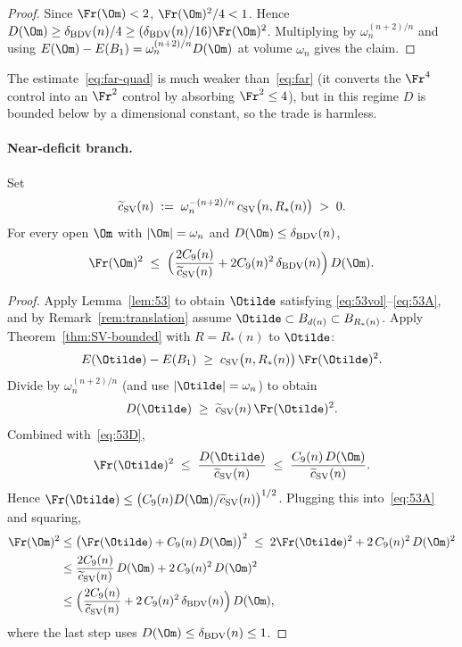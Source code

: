 \begin{proof}
Since $\Fr(\Om)<2$, $\Fr(\Om)^2/4<1$. Hence
$D(\Om)\ge\delta_{\rm BDV}(n)/4\ge(\delta_{\rm BDV}(n)/16)\Fr(\Om)^2$.
Multiplying by $\omega_n^{(n+2)/n}$ and using
$E(\Om)-E(B_1)=\omega_n^{(n+2)/n}D(\Om)$ at volume $\omega_n$ gives the
claim.
\end{proof}

\begin{remark}
The estimate~\eqref{eq:far-quad} is much weaker than~\eqref{eq:far}
(it converts the $\Fr^4$ control into an $\Fr^2$ control by absorbing
$\Fr^2\le 4$), but in this regime $D$ is bounded below by a
dimensional constant, so the trade is harmless.
\end{remark}

\paragraph{Near-deficit branch.}

\begin{lemma}\label{lem:near}
Set
\begin{equation}\label{eq:csv-tilde}
\widetilde c_{\rm SV}(n)
\;:=\; \omega_n^{-(n+2)/n}\,c_{\rm SV}\bigl(n,R_*(n)\bigr)\;>\;0.
\end{equation}
For every open $\Om$ with $|\Om|=\omega_n$ and
$D(\Om)\le\delta_{\rm BDV}(n)$,
\begin{equation}\label{eq:near-Fr}
\Fr(\Om)^2 \;\le\;
\Bigl(\frac{2C_9(n)}{\widetilde c_{\rm SV}(n)}
+2C_9(n)^2\,\delta_{\rm BDV}(n)\Bigr)\,D(\Om).
\end{equation}
\end{lemma}

\begin{proof}
Apply Lemma~\ref{lem:53} to obtain $\Otilde$ satisfying
\eqref{eq:53vol}--\eqref{eq:53A}, and by Remark~\ref{rem:translation}
assume $\Otilde\subset B_{d(n)}\subset B_{R_*(n)}$. Apply
Theorem~\ref{thm:SV-bounded} with $R=R_*(n)$ to $\Otilde$:
\[
E(\Otilde)-E(B_1) \;\ge\; c_{\rm SV}\bigl(n,R_*(n)\bigr)\,\Fr(\Otilde)^2.
\]
Divide by $\omega_n^{(n+2)/n}$ (and use $|\Otilde|=\omega_n$) to obtain
\begin{equation}\label{eq:Dtilde-Atilde}
D(\Otilde) \;\ge\; \widetilde c_{\rm SV}(n)\,\Fr(\Otilde)^2.
\end{equation}
Combined with~\eqref{eq:53D},
\[
\Fr(\Otilde)^2 \;\le\;
\frac{D(\Otilde)}{\widetilde c_{\rm SV}(n)}
\;\le\;
\frac{C_9(n)\,D(\Om)}{\widetilde c_{\rm SV}(n)}.
\]
Hence
$\Fr(\Otilde)\le\bigl(C_9(n)D(\Om)/\widetilde c_{\rm SV}(n)\bigr)^{1/2}$.
Plugging this into~\eqref{eq:53A} and squaring,
\begin{align*}
\Fr(\Om)^2
&\le \bigl(\Fr(\Otilde) + C_9(n)\,D(\Om)\bigr)^2
\;\le\; 2\Fr(\Otilde)^2 + 2\,C_9(n)^2\,D(\Om)^2 \\
&\le \frac{2C_9(n)}{\widetilde c_{\rm SV}(n)}\,D(\Om)
   + 2\,C_9(n)^2\,D(\Om)^2 \\
&\le \Bigl(\frac{2C_9(n)}{\widetilde c_{\rm SV}(n)}
   + 2\,C_9(n)^2\,\delta_{\rm BDV}(n)\Bigr)\,D(\Om),
\end{align*}
where the last step uses $D(\Om)\le\delta_{\rm BDV}(n)\le 1$.
\end{proof}

